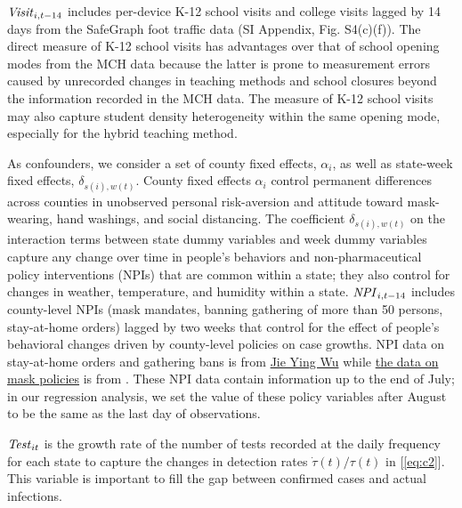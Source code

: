 \documentclass[9pt,twocolumn,twoside,lineno]{pnas-new}
\begin{document}
$\text{\textit{Visit}}_{i,t-14}$ includes per-device  K-12 school visits and college visits lagged by 14 days from the SafeGraph foot traffic data (SI Appendix, Fig. S4(c)(f)). The direct measure of K-12 school visits has advantages over that of school opening modes from the MCH data because the latter is prone to measurement errors caused by unrecorded changes in teaching methods and school closures beyond the information recorded in the MCH data.   The measure of K-12 school visits may also capture student density heterogeneity within the same opening mode, especially for the hybrid teaching method.

As confounders, we consider a set of county fixed effects, $\alpha_i$, as well as state-week fixed effects, $\delta_{s(i),w(t)}$. County fixed effects $\alpha_i$ control permanent differences across counties in unobserved personal risk-aversion and attitude toward mask-wearing, hand washings, and social distancing. The coefficient $\delta_{s(i),w(t)}$  on the interaction terms between state dummy variables and week dummy variables capture any change over time in people's behaviors and non-pharmaceutical policy interventions (NPIs) that are common within a state; they also control for changes in weather, temperature, and humidity within a state.  $\text{\textit{NPI}}_{i,t-14}$ includes
county-level NPIs (mask mandates, banning gathering of more than 50 persons, stay-at-home orders) lagged by two weeks that control for the effect of people's behavioral changes driven by county-level policies on case growths. NPI  data on stay-at-home orders and gathering bans is from \href{https://github.com/JieYingWu/COVID-19_US_County-level_Summaries}{Jie Ying Wu} \cite{killeen2020} while  \href{https://drive.google.com/uc?export=download&id=1qVIhPaBQ-apdDjOaKV2eA9SgZNkLMLAm}{the data on mask policies} is from  \cite{Wright2020}. These NPI data contain information up to the end of July; in our regression analysis, we set the value of these policy variables after August to be the same as the last day of observations.

$\text{\textit{Test}}_{it}$ is the growth rate of the number of tests recorded at the daily frequency for each state to capture the changes in detection rates ${\dot{\tau}(t)}/{\tau(t)}$ in [\ref{eq:c2}].  This variable is important to fill the gap between confirmed cases and actual infections.
\end{document}
